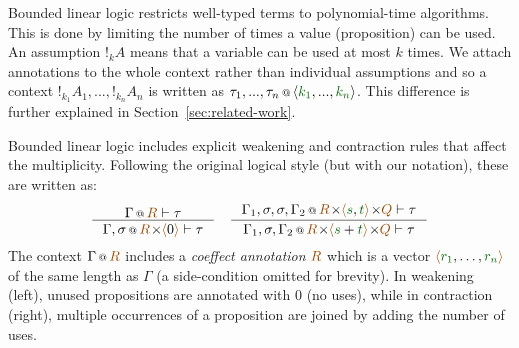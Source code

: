 Bounded linear logic \cite{girard1992bounded} restricts well-typed terms to polynomial-time algorithms.  
This is done by limiting the number of times a value (proposition) can be used. An assumption
$!_k A$ means that a variable can be used at most $k$ times. 
We attach annotations to the whole context rather than individual assumptions and so a context
$!_{k_1} A_1, ..., !_{k_n} A_n$ is written as $\coctx{\tau_1, ..., \tau_n}{\langle \cclrd{k_1}, ..., \cclrd{k_n}\rangle}$. 
This difference is further explained in Section~\ref{sec:related-work}. %

Bounded linear logic includes explicit weakening and contraction rules
that affect the multiplicity. Following the original logical style (but with our notation), these are written as:
\[
\inference
  {\coctx{\Gamma}{\aclrd{R}} \vdash \tau}
  {\coctx{\Gamma,\sigma}{\aclrd{R} \cons \alift{0}} \vdash \tau} 
\quad
\inference
  {\coctx{\Gamma_1,\sigma,\sigma,\Gamma_2}{\aclrd{R}\cons \alift{\cclrd{s},\cclrd{t}} \cons \aclrd{Q}} \vdash \tau}
  {\coctx{\Gamma_1,\sigma,\Gamma_2}{\aclrd{R}\cons\alift{\cclrd{s}+\cclrd{t}} \cons \aclrd{Q}} \vdash \tau}
\]
The context $\coctx{\Gamma}{\aclrd{R}}$ includes a \emph{coeffect annotation} $\aclrd{R}$ which is a vector
$\alift{\cclrd{r_1}, \ldots, \cclrd{r_n}}$ of the same length as $\Gamma$ (a side-condition omitted for brevity).
In weakening (left), unused propositions are annotated with $0$ (no uses), while in contraction (right), multiple 
occurrences of a proposition are joined by adding the number of uses.



